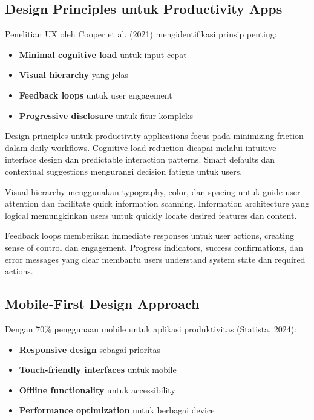 \subsection{Design Principles untuk Productivity Apps}

Penelitian UX oleh Cooper et al. (2021) mengidentifikasi prinsip penting:

\begin{itemize}
\item \textbf{Minimal cognitive load} untuk input cepat
\item \textbf{Visual hierarchy} yang jelas
\item \textbf{Feedback loops} untuk user engagement
\item \textbf{Progressive disclosure} untuk fitur kompleks
\end{itemize}

Design principles untuk productivity applications focus pada minimizing friction dalam daily workflows. Cognitive load reduction dicapai melalui intuitive interface design dan predictable interaction patterns. Smart defaults dan contextual suggestions mengurangi decision fatigue untuk users.

Visual hierarchy menggunakan typography, color, dan spacing untuk guide user attention dan facilitate quick information scanning. Information architecture yang logical memungkinkan users untuk quickly locate desired features dan content.

Feedback loops memberikan immediate responses untuk user actions, creating sense of control dan engagement. Progress indicators, success confirmations, dan error messages yang clear membantu users understand system state dan required actions.

\subsection{Mobile-First Design Approach}

Dengan 70\% penggunaan mobile untuk aplikasi produktivitas (Statista, 2024):

\begin{itemize}
\item \textbf{Responsive design} sebagai prioritas
\item \textbf{Touch-friendly interfaces} untuk mobile
\item \textbf{Offline functionality} untuk accessibility
\item \textbf{Performance optimization} untuk berbagai device
\end{itemize}

